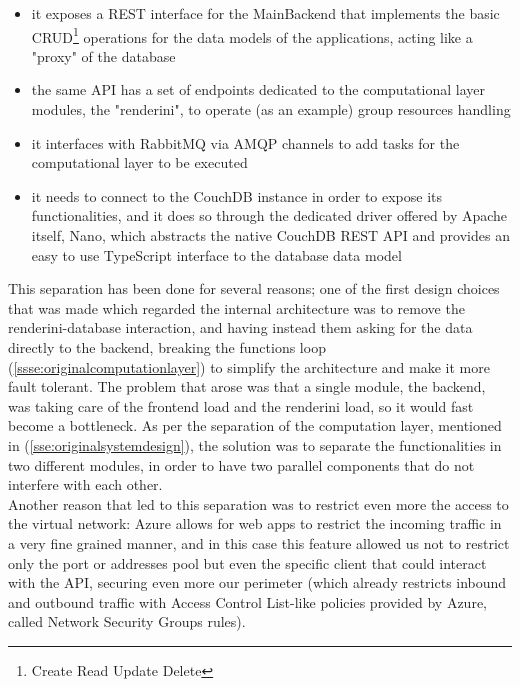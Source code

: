 \begin{enumerate}
\begin{itemize}
        \item it exposes a REST interface for the MainBackend that implements the basic CRUD\footnote{Create Read Update Delete} operations for the data models of the applications, acting like a "proxy" of the database
        \item the same API has a set of endpoints dedicated to the computational layer modules, the "renderini", to operate (as an example) group resources handling
        \item it interfaces with RabbitMQ via AMQP channels to add tasks for the computational layer to be executed
        \item it needs to connect to the CouchDB instance in order to expose its functionalities, and it does so through the dedicated driver offered by Apache itself, Nano, which abstracts the native CouchDB REST API and provides an easy to use TypeScript interface to the database data model
      \end{itemize}
  \end{enumerate}
  This separation has been done for several reasons; one of the first design choices that was made which regarded the internal architecture was to remove the renderini-database interaction, and having instead them asking for the data directly to the backend, breaking the functions loop (\ref{ssse:originalcomputationlayer}) to simplify the architecture and make it more fault tolerant. The problem that arose was that a single module, the backend, was taking care of the frontend load and the renderini load, so it would fast become a bottleneck. As per the separation of the computation layer, mentioned in (\ref{sse:originalsystemdesign}), the solution was to separate the functionalities in two different modules, in order to have two parallel components that do not interfere with each other.\\
  Another reason that led to this separation was to restrict even more the access to the virtual network: Azure allows for web apps to restrict the incoming traffic in a very fine grained manner, and in this case this feature allowed us not to restrict only the port or addresses pool but even the specific client that could interact with the API, securing even more our perimeter (which already restricts inbound and outbound traffic with Access Control List-like policies provided by Azure, called Network Security Groups rules).
